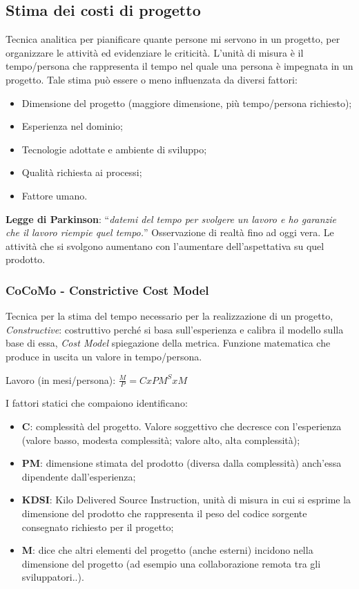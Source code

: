 \subsection{Stima dei costi di progetto}
Tecnica analitica per pianificare quante persone mi servono in un progetto, per organizzare le attività ed
evidenziare le criticità. L'unità di misura è il tempo/persona che rappresenta il tempo nel quale una persona è impegnata in un progetto. Tale stima può essere o meno influenzata da diversi fattori:
\begin{itemize}
\item Dimensione del progetto (maggiore dimensione, più tempo/persona richiesto);
\item Esperienza nel dominio;
\item Tecnologie adottate e ambiente di sviluppo;
\item Qualità richiesta ai processi;
\item Fattore umano.
\end{itemize}

\textbf{Legge di Parkinson}: ``\emph{datemi del tempo per svolgere un lavoro e ho garanzie che il lavoro riempie quel tempo.}''
Osservazione di realtà fino ad oggi vera. Le attività che si svolgono aumentano con l'aumentare dell'aspettativa su quel prodotto.\\

\subsubsection{CoCoMo - Constrictive Cost Model}
Tecnica per la stima del tempo necessario per la realizzazione di un progetto, \textit{Constructive}: costruttivo perché si basa sull'esperienza e calibra il modello sulla base di essa, \textit{Cost Model} spiegazione della metrica.
Funzione matematica che produce in uscita un valore in tempo/persona.
\begin{center}
Lavoro (in mesi/persona): $ \frac{M}{P} = C x PM^S x M $
\end{center}
I fattori statici che compaiono identificano:
\begin{itemize}
\item \textbf{C}: complessità del progetto. Valore soggettivo che decresce con l'esperienza (valore basso, modesta complessità; valore alto, alta complessità);
\item \textbf{PM}: dimensione stimata del prodotto (diversa dalla complessità) anch'essa dipendente dall'esperienza;
\item \textbf{KDSI}: Kilo Delivered Source Instruction, unità di misura in cui si esprime la dimensione del prodotto che rappresenta il peso del codice sorgente consegnato richiesto per il progetto;
\item \textbf{M}: dice che altri elementi del progetto (anche esterni) incidono nella dimensione del progetto (ad esempio una collaborazione remota tra gli sviluppatori..).
\end{itemize}

